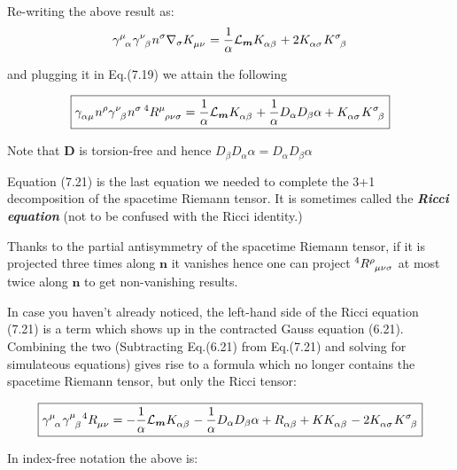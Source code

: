 \documentclass[12pt]{article}
\renewcommand{\vec}[1]{\bm{#1}}
\numberwithin{equation}{section}
\numberwithin{theorem}{subsection}
\begin{document}
Re-writing the above result as: $$\tensor{\gamma}{^\mu_\alpha}\tensor{\gamma}{^\nu_\beta}n^{\sigma}\nabla_{\sigma}\tensor{K}{_\mu_\nu} = \frac{1}{\alpha}\mathcal{L}_{\vec{m}}\tensor{K}{_\alpha_\beta} + 2\tensor{K}{_\alpha_\sigma}\tensor{K}{^\sigma_\beta}$$

and plugging it in Eq.(7.19) we attain the following

\begin{equation}

    \boxed{\tensor{\gamma}{_\alpha_\mu}n^{\rho}\tensor{\gamma}{^\nu_\beta}n^{\sigma} \, ^{4}\tensor{R}{^\mu_\rho_\nu_\sigma} = \frac{1}{\alpha}\mathcal{L}_{\vec{m}}\tensor{K}{_\alpha_\beta}+\frac{1}{\alpha}D_{\alpha}D_{\beta}\alpha+\tensor{K}{_\alpha_\sigma}\tensor{K}{^\sigma_\beta}}

\end{equation}

Note that $\vec{D}$ is torsion-free and hence $D_{\beta}D_{\alpha}\alpha = D_{\alpha}D_{\beta}\alpha$

Equation (7.21) is the last equation we needed to complete the 3+1 decomposition of the spacetime Riemann tensor. It is sometimes called the \textbf{\textit{Ricci equation}} (not to be confused with the Ricci identity.)

Thanks to the partial antisymmetry of the spacetime Riemann tensor, if it is projected three times along $\vec{n}$ it vanishes hence one can project $^{4}\tensor{R}{^\rho_\mu_\nu_\sigma}$ at most twice along $\vec{n}$ to get non-vanishing results. 

\newline In case you haven't already noticed, the left-hand side of the Ricci equation (7.21) is a term which shows up in the contracted Gauss equation (6.21). Combining the two (Subtracting Eq.(6.21) from Eq.(7.21) and solving for simulateous equations) gives rise to a formula which no longer contains the spacetime Riemann tensor, but only the Ricci tensor:

\begin{equation}

    \boxed{\tensor{\gamma}{^\mu_\alpha}\tensor{\gamma}{^\mu_\beta}^{4}\tensor{R}{_\mu_\nu} = -\frac{1}{\alpha}\mathcal{L}_{\vec{m}}\tensor{K}{_\alpha_\beta} - \frac{1}{\alpha}D_{\alpha}D_{\beta}\alpha + \tensor{R}{_\alpha_\beta}+ K\tensor{K}{_\alpha_\beta}-2\tensor{K}{_\alpha_\sigma}\tensor{K}{^\sigma_\beta}}

\end{equation}

In index-free notation the above is:
\end{document}
